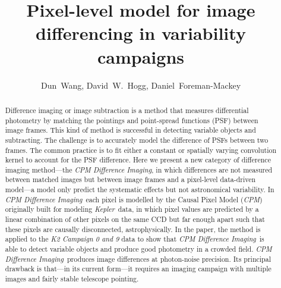 \documentclass[12pt, preprint]{aastex}
\newcommand{\project}[1]{\textsl{#1}}
\newcommand{\cpm}{\project{CPM}}
\newcommand{\cpmdiff}{\project{CPM Difference Imaging}}
\newcommand{\kepler}{\project{Kepler}}
\begin{document}
\title{Pixel-level model for image differencing in variability campaigns}
\author{%
  Dun~Wang\altaffilmark{\ref{CCPP}},
  David~W.~Hogg\altaffilmark{\ref{CCPP},\ref{CDS},\ref{MPIA},\ref{email}},
  Daniel~Foreman-Mackey\altaffilmark{\ref{UW},\ref{SF}}
  }
\setcounter{address}{1}


\begin{abstract}
Difference imaging or image subtraction is a method that measures differential photometry by matching the pointings and point-spread functions (PSF) between image frames. 
This kind of method is successful in detecting variable objects and subtracting. The challenge is to accurately model the difference of PSFs between two frames. The common practice is to fit either a constant or spatially varying convolution kernel to account for the PSF difference.
Here we present a new category of difference imaging method---the \cpmdiff, in which differences are not measured between matched images but between image frames and a pixel-level data-driven model---a model only predict the systematic effects but not astronomical variability. 
In \cpmdiff\ each pixel is modelled by the Causal Pixel Model (\cpm) originally built for modeling \kepler\ data, in which pixel values are predicted by a linear combination of other pixels on the same CCD but far enough apart such that these pixels are causally disconnected, astrophysically. 
In the paper, the method is applied to the \project{K2 Campaign 0 and 9} data to show that \cpmdiff\ is able to detect variable objects and produce good photometry in a crowded field.
\cpmdiff\ produces image differences at photon-noise precision. 
Its principal drawback is that---in its current form---it requires an imaging campaign with multiple images and fairly stable telescope pointing.

\end{abstract}
\end{document}
